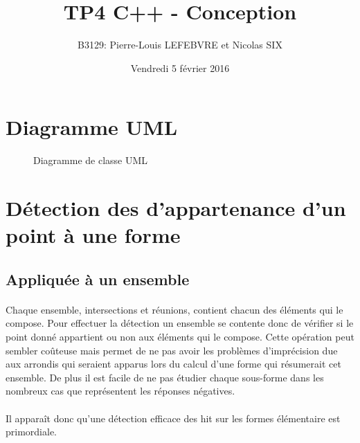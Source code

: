 \documentclass[a4paper, 12pts]{article}
\title{TP4 C++ - Conception}
\author{B3129: Pierre-Louis LEFEBVRE et Nicolas SIX}
\date{Vendredi 5 février 2016}
\begin{document}
\begin{titlepage}

\maketitle

\end{titlepage}


\tableofcontents

\pagebreak



\section{Diagramme UML}

\begin{figure}[h]
    \centering
    \def\svgwidth{\columnwidth}
    
    \caption{Diagramme de classe UML}
\end{figure}

\section{Détection des d’appartenance d'un point à une forme}

\subsection{Appliquée à un ensemble}
\paragraph{}
Chaque ensemble, intersections et réunions, contient chacun des éléments qui le compose. Pour effectuer la détection un ensemble se contente donc de vérifier si le point donné appartient ou non aux éléments qui le compose. Cette opération peut sembler coûteuse mais permet de ne pas avoir les problèmes d’imprécision due aux arrondis qui seraient apparus lors du calcul d'une forme qui résumerait cet ensemble. De plus il est facile de ne pas étudier chaque sous-forme dans les nombreux cas que représentent les réponses négatives.
\paragraph{}
Il apparaît donc qu'une détection efficace des hit sur les formes élémentaire est primordiale.
\end{document}
